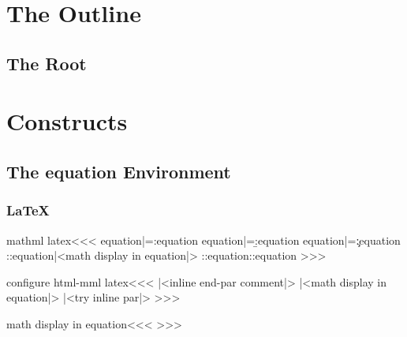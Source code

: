 \chapter{The Outline}

\section{The Root}


\chapter{Constructs}

\section{The equation Environment}


\subsection{LaTeX}


\<mathml latex\><<<
\let\A:equation|=\a:equation
\let\B:equation|=\b:equation
\let\C:equation|=\c:equation
  {\A:equation|<math display in equation|>}
  {\B:equation}{\C:equation}
>>>

\<configure html-mml latex\><<<
  {\IgnorePar|<inline end-par comment|>\EndP
   \IgnorePar
     |<math display in equation|>}
  {\ifvmode \IgnorePar\fi\EndP{}}
  {|<try inline par|>}
>>>

\<math display in equation\><<<
\Configure{$$}
   {\IgnorePar\EndP\DviMath}
   {\EndDviMath\EndP}
   {\DisplayMathtrue}%
>>>



